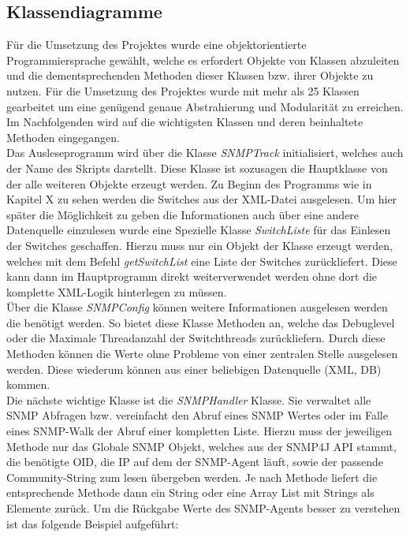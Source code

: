 \subsection{Klassendiagramme}
\label{subsec:classdiagrams}

Für die Umsetzung des Projektes wurde eine objektorientierte Programmiersprache gewählt, welche es erfordert Objekte von Klassen abzuleiten und die dementsprechenden Methoden dieser Klassen bzw. ihrer Objekte zu nutzen. Für die Umsetzung des Projektes wurde mit mehr als 25 Klassen gearbeitet um eine genügend genaue Abstrahierung und Modularität zu erreichen. Im Nachfolgenden wird auf die wichtigsten Klassen und deren beinhaltete Methoden eingegangen.\\
Das Ausleseprogramm wird über die Klasse \textit{SNMPTrack } initialisiert, welches auch der Name des Skripts darstellt. Diese Klasse ist sozusagen die Hauptklasse von der alle weiteren Objekte erzeugt werden. Zu Beginn des Programms wie in Kapitel X zu sehen werden die Switches aus der XML-Datei ausgelesen. Um hier später die Möglichkeit zu geben die Informationen auch über eine andere Datenquelle einzulesen wurde eine Spezielle Klasse \textit{SwitchListe} für das Einlesen der Switches geschaffen. Hierzu muss nur ein Objekt der Klasse erzeugt werden, welches mit dem Befehl \textit{getSwitchList} eine Liste der Switches zurückliefert. Diese kann dann im Hauptprogramm direkt weiterverwendet werden ohne dort die komplette XML-Logik hinterlegen zu müssen.\\
Über die Klasse \textit{SNMPConfig} können weitere Informationen ausgelesen werden die benötigt werden. So bietet diese Klasse Methoden an, welche das Debuglevel oder die Maximale Threadanzahl der Switchthreads zurückliefern. Durch diese Methoden können die Werte ohne Probleme von einer zentralen Stelle ausgelesen werden. Diese wiederum können aus einer beliebigen Datenquelle (XML, DB) kommen.\\
Die nächste wichtige Klasse ist die \textit{SNMPHandler} Klasse. Sie verwaltet alle SNMP Abfragen bzw. vereinfacht den Abruf eines SNMP Wertes oder im Falle eines SNMP-Walk der Abruf einer kompletten Liste. Hierzu muss der jeweiligen Methode nur das Globale SNMP Objekt, welches aus der SNMP4J API stammt, die benötigte OID, die IP auf dem der SNMP-Agent läuft, sowie der passende Community-String zum lesen übergeben werden. Je nach Methode liefert die entsprechende Methode dann ein String oder eine Array List mit Strings als Elemente zurück. Um die Rückgabe Werte des SNMP-Agents besser zu verstehen ist das folgende Beispiel aufgeführt:\\

